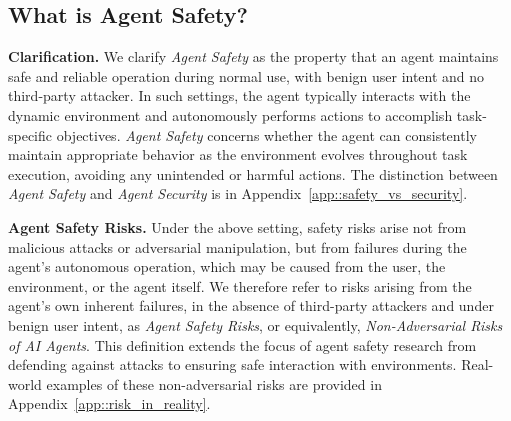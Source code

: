 \subsection{What is Agent Safety?}

\textbf{Clarification.}
We clarify \textit{Agent Safety} as the property that an agent maintains safe and reliable operation during normal use, with benign user intent and no third-party attacker. In such settings, the agent typically interacts with the dynamic environment and autonomously performs actions to accomplish task-specific objectives. \textit{Agent Safety} concerns whether the agent can consistently maintain appropriate behavior as the environment evolves throughout task execution, avoiding any unintended or harmful actions. 
The distinction between \textit{Agent Safety} and \textit{Agent Security} is in Appendix~\ref{app::safety_vs_security}.



\textbf{Agent Safety Risks.}
Under the above setting, safety risks arise not from malicious attacks or adversarial manipulation, but from failures during the agent's autonomous operation, which may be caused from the user, the environment, or the agent itself. We therefore refer to risks arising from the agent's own inherent failures, in the absence of third-party attackers and under benign user intent, as \textit{Agent Safety Risks}, or equivalently, \textit{Non-Adversarial Risks of AI Agents}. 
This definition extends the focus of agent safety research from defending against attacks to ensuring safe interaction with environments.
Real-world examples of these non-adversarial risks are provided in Appendix~\ref{app::risk_in_reality}.


